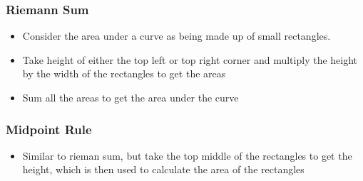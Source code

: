     \subsubsection{Riemann Sum}

      \begin{itemize}
        \item Consider the area under a curve as being made up of small rectangles.
        \item Take height of either the top left or top right corner and
        multiply the height by the width of the rectangles to get the areas
        \item Sum all the areas to get the area under the curve
      \end{itemize}

    \subsubsection{Midpoint Rule}

      \begin{itemize}
        \item Similar to rieman sum, but take the top middle of the rectangles
        to get the height, which is then used to calculate the area of the
        rectangles
      \end{itemize}
